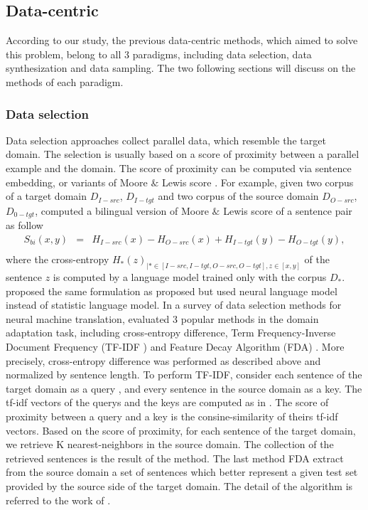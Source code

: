 \subsection{Data-centric}
\label{ssec:case-2-data}
According to our study, the previous data-centric methods, which aimed to solve this problem, belong to all 3 paradigms, including data selection, data synthesization and data sampling. The two following sections will discuss on the methods of each paradigm.
\subsubsection{Data selection}
Data selection approaches collect parallel data, which resemble the target domain. The selection is usually based on a score of proximity between a parallel example and the domain. The score of proximity can be computed via sentence embedding, or variants of Moore $\&$ Lewis score \cite{Moore10intelligent}. For example, given two corpus of a target domain $D_{I-src}$, $D_{I-tgt}$ and two corpus of the source domain $D_{O-src}$, $D_{0-tgt}$, \cite{Axelrod11domain} computed a bilingual version of Moore $\&$ Lewis score of a sentence pair as follow
\begin{equation}
\begin{array}{rcl}
S_{bi} (x,y) &=& H_{I-src}(x) - H_{O-src}(x) + H_{I-tgt}(y) - H_{O-tgt}(y), \\
\end{array}
\end{equation}
where the cross-entropy $H_{*}(z)_{| * \in [I-src, I-tgt, O-src, O-tgt], z \in [x,y]}$ of the sentence $z$ is computed by a language model trained only with the corpus $D_{*}$. \citet{Duh13adaptation} proposed the same formulation as proposed \citet{Axelrod11domain} but used neural language model instead of statistic language model. In a survey of data selection methods for neural machine translation, \citet{Silva18extracting} evaluated 3 popular methods in the domain adaptation task, including cross-entropy difference, Term Frequency-Inverse Document Frequency (TF-IDF ) \citep{Salton73On} and Feature Decay Algorithm (FDA) \citep{Poncelas18Feature}. More precisely, cross-entropy difference was performed as described above and normalized by sentence length. To perform TF-IDF, \citet{Silva18extracting} consider each sentence of the target domain as a query , and every sentence in the source domain as a key. The tf-idf vectors of the querys and the keys are computed as in \citet{Salton73On}. The score of proximity between a query and a key is the consine-similarity of theirs tf-idf vectors. Based on the score of proximity, for each sentence of the target domain, we retrieve K nearest-neighbors in the source domain. The collection of the retrieved sentences is the result of the method. The last method FDA extract from the source domain a set of sentences which better represent a given test set provided by the source side of the target domain. The detail of the algorithm is referred to the work of \citet{Poncelas18Feature}. 

